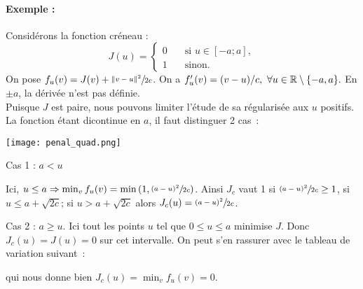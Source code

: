 \documentclass[main.tex]{subfiles}
\begin{document}
\begin{multicols}{2}
\paragraph{Exemple :} Considérons la fonction créneau :
$$J(u)= \left\{  \begin{aligned}
0 \quad & \textrm{si } u \in [-a;a], \\ 1 \quad & \textrm{sinon}. 
\end{aligned}   \right. $$
On pose $f_u(v) = J(v) + \sfrac{\| v-u \|^2}{2c}$.
On a $f'_u(v) = (v-u)/c, \ \forall u \in \mathbb{R} \setminus \{ -a, a \}. $
En $\pm a$, la dérivée n'est pas définie. \\
Puisque $J$ est paire, nous pouvons limiter l'étude de sa régularisée aux $u$ positifs. La fonction étant dicontinue en $a$, il faut distinguer 2 cas~:
\begin{center}
\texttt{[image: penal\_quad.png]}
\end{center}
\end{multicols}
\begin{myitemize}
\renewcommand{\labelitemi}{\scriptsize$\bullet$} 
\item Cas 1 : $a < u$
\begin{center}
\end{center}
Ici, $u\leq a \Rightarrow \min_v f_u(v) = \min \left(1, \sfrac{(a-u)^2}{2c} \right)  $. Ainsi $J_c$ vaut 1 si $\sfrac{(a-u)^2}{2c} \geq 1$, \ie si $u\leq a+\sqrt{2c}$; si $u>a+\sqrt{2c}$ alors $J_c(u)=\sfrac{(a-u)^2}{2c}$.
\item Cas 2 : $ a \geq u$. Ici tout les points $u$ tel que $0\leq u \leq a$ minimise $J$. Donc $J_c(u)=J(u)=0$ sur cet intervalle. On peut s'en rassurer avec le tableau de variation suivant~:
\begin{center}
\end{center}
qui nous donne bien $J_c(u) = \min_v f_u(v) = 0$.
\end{myitemize}
\end{document}
